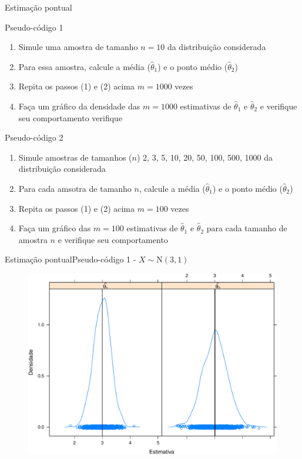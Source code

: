 \documentclass[10pt]{beamer}\usepackage[]{graphicx}\usepackage[]{color}
\providecommand{\N}{\text{N}}
\theoremstyle{definition}
\begin{document}
\begin{frame}[fragile]{Estimação pontual}
  \begin{block}{Pseudo-código 1}
    \small
    \begin{enumerate}
    \item Simule uma amostra de tamanho $n = 10$ da distribuição considerada
    \item Para essa amostra, calcule a média ($\hat{\theta}_1$) e o ponto
      médio ($\hat{\theta}_2$)
    \item Repita os passos (1) e (2) acima $m = 1000$ vezes
    \item Faça um gráfico da densidade das $m = 1000$ estimativas de
      $\hat{\theta}_1$ e $\hat{\theta}_2$ e verifique seu comportamento
      verifique
    \end{enumerate}
  \end{block}
  \begin{block}{Pseudo-código 2}
    \small
  \begin{enumerate}
  \item Simule amostras de tamanhos ($n$) 2, 3, 5, 10, 20, 50, 100, 500,
    1000 da distribuição considerada
  \item Para cada amsotra de tamanho $n$, calcule a média
    ($\hat{\theta}_1$) e o ponto médio ($\hat{\theta}_2$)
  \item Repita os passos (1) e (2) acima $m = 100$ vezes
  \item Faça um gráfico das $m = 100$ estimativas de
    $\hat{\theta}_1$ e $\hat{\theta}_2$ para cada tamanho de amostra $n$
    e verifique seu comportamento
  \end{enumerate}
\end{block}
\end{frame}

\begin{frame}[fragile]{Estimação pontual}{Pseudo-código 1 - $X \sim \N(3,1)$}
  \begin{figure}[h]
    \centering
    \includegraphics[width=1\textwidth]{vies_normal-crop}
  \end{figure}
\end{frame}
\end{document}
